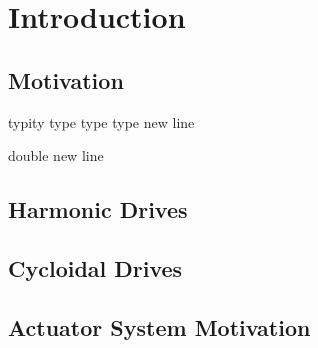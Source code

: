 
\chapter{Introduction}\label{ch:intro}


\section{Motivation} \label{intro:motivation}

typity type type type
new line

double new line 

\section{Harmonic Drives} \label{intro:harmonic}

\section{Cycloidal Drives} \label{intro:cycloid}

\section{Actuator System Motivation} \label{intro:projects}
